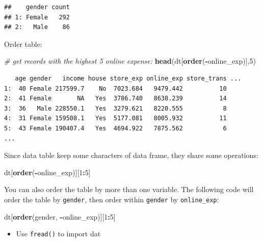\documentclass[12pt,]{krantz}
\makeatletter
\newenvironment{Shaded}{\begin{snugshade}}{\end{snugshade}}
\newcommand{\CommentTok}[1]{\textcolor[rgb]{0.37,0.37,0.37}{\textit{#1}}}
\newcommand{\DecValTok}[1]{\textcolor[rgb]{0.06,0.06,0.06}{#1}}
\newcommand{\KeywordTok}[1]{\textcolor[rgb]{0.27,0.27,0.27}{\textbf{#1}}}
\newcommand{\NormalTok}[1]{#1}
\newcommand{\OperatorTok}[1]{\textcolor[rgb]{0.43,0.43,0.43}{\textbf{#1}}}
\providecommand{\tightlist}{%
  \setlength{\itemsep}{0pt}\setlength{\parskip}{0pt}}
\newenvironment{kframe}{%
\medskip{}
\setlength{\fboxsep}{.8em}
 \def\at@end@of@kframe{}%
 \ifinner\ifhmode%
  \def\at@end@of@kframe{\end{minipage}}%
  \begin{minipage}{\columnwidth}%
 \fi\fi%
 \def\FrameCommand##1{\hskip\@totalleftmargin \hskip-\fboxsep
 \colorbox{shadecolor}{##1}\hskip-\fboxsep
     \hskip-\linewidth \hskip-\@totalleftmargin \hskip\columnwidth}%
 \MakeFramed {\advance\hsize-\width
   \@totalleftmargin\z@ \linewidth\hsize
   \@setminipage}}%
 {\par\unskip\endMakeFramed%
 \at@end@of@kframe}
\renewenvironment{Shaded}{\begin{kframe}}{\end{kframe}}
\makeatother
\begin{document}
\begin{verbatim}
##    gender count
## 1: Female   292
## 2:   Male    86
\end{verbatim}

Order table:

\begin{Shaded}
\begin{Highlighting}[]
\CommentTok{# get records with the highest 5 online expense:}
\KeywordTok{head}\NormalTok{(dt[}\KeywordTok{order}\NormalTok{(}\OperatorTok{-}\NormalTok{online_exp)],}\DecValTok{5}\NormalTok{) }
\end{Highlighting}
\end{Shaded}

\begin{verbatim}
   age gender   income house store_exp online_exp store_trans ...
1:  40 Female 217599.7    No  7023.684   9479.442          10
2:  41 Female       NA   Yes  3786.740   8638.239          14
3:  36   Male 228550.1   Yes  3279.621   8220.555           8
4:  31 Female 159508.1   Yes  5177.081   8005.932          11
5:  43 Female 190407.4   Yes  4694.922   7875.562           6
...
\end{verbatim}

Since data table keep some characters of data frame, they share some operations:

\begin{Shaded}
\begin{Highlighting}[]
\NormalTok{dt[}\KeywordTok{order}\NormalTok{(}\OperatorTok{-}\NormalTok{online_exp)][}\DecValTok{1}\OperatorTok{:}\DecValTok{5}\NormalTok{]}
\end{Highlighting}
\end{Shaded}

You can also order the table by more than one variable. The following code will order the table by \texttt{gender}, then order within \texttt{gender} by \texttt{online\_exp}:

\begin{Shaded}
\begin{Highlighting}[]
\NormalTok{dt[}\KeywordTok{order}\NormalTok{(gender, }\OperatorTok{-}\NormalTok{online_exp)][}\DecValTok{1}\OperatorTok{:}\DecValTok{5}\NormalTok{]}
\end{Highlighting}
\end{Shaded}

\begin{itemize}
\tightlist
\item
  Use \texttt{fread()} to import dat
\end{itemize}
\end{document}

